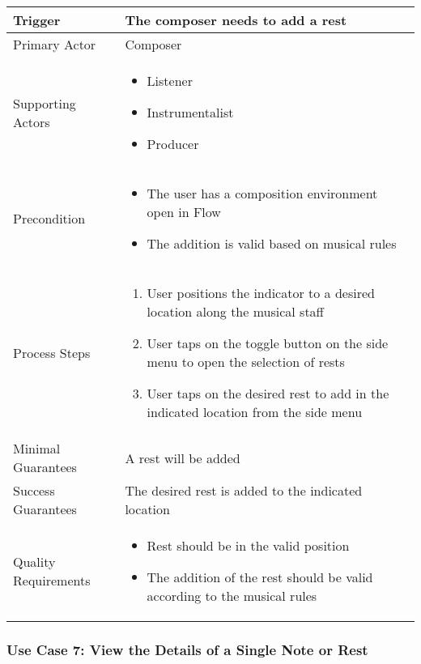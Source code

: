 \begin{tabularx}{\textwidth}{|X|X|}
\hline
Trigger &
The composer needs to add a rest \\
\hline
Primary Actor &
Composer \\
\hline
Supporting Actors & 
\begin{itemize}
\item Listener
\item Instrumentalist
\item Producer
\end{itemize} \\
\hline
Precondition & 
\begin{itemize}
\item The user has a composition environment open in Flow
\item The addition is valid based on musical rules
\end{itemize} \\
\hline
Process Steps & 
\begin{enumerate}
\item User positions the indicator to a desired location along the musical staff
\item User taps on the toggle button on the side menu to open the selection of rests
\item User taps on the desired rest to add in the indicated location from the side menu
\end{enumerate} \\
\hline
Minimal Guarantees & 
A rest will be added \\
\hline
Success Guarantees & 
The desired rest is added to the indicated location \\
\hline
Quality Requirements & 
\begin{itemize}
\item Rest should be in the valid position
\item The addition of the rest should be valid according to the musical rules
\end{itemize} \\ 
\hline
\end{tabularx}

\subsubsection{Use Case 7: View the Details of a Single Note or Rest}

